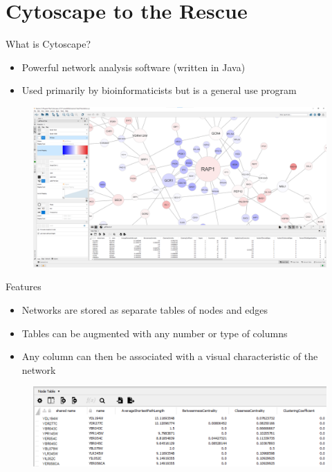 \documentclass{beamer}
\begin{document}
\section{Cytoscape to the Rescue}
\begin{frame}{What is Cytoscape?}
  \begin{itemize}
    \item Powerful network analysis software (written in Java)
    \item Used primarily by bioinformaticists but is a general use program
  \end{itemize}
  \begin{figure}
    \begin{center}
      \includegraphics[width=1\textwidth]{cytoyeast.png}
    \end{center}
  \end{figure}
\end{frame}

\begin{frame}{Features}
  \begin{itemize}
    \item Networks are stored as separate tables of nodes and edges
    \item Tables can be augmented with any number or type of columns
    \item Any column can then be associated with a visual characteristic of the network
  \end{itemize}
  \begin{figure}
    \begin{center}
      \includegraphics[width=1\textwidth]{nodetable.png}
    \end{center}
  \end{figure}
\end{frame}
\end{document}
